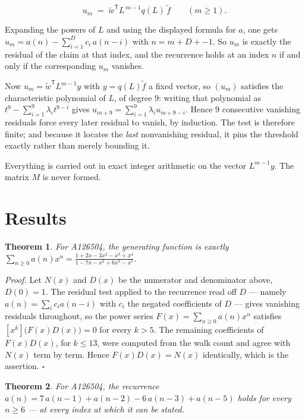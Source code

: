\documentclass[11pt]{article}
\newtheorem{theorem}{Theorem}
\theoremstyle{definition}
\begin{document}
\[u_m \;=\; \tilde w^{\mathsf T} L^{\,m-1} q(L)\,\tilde f \qquad (m \ge 1).\]

Expanding the powers of $L$ and using the displayed formula for $a$, one gets $u_m = a(n) - \sum_{i=1}^{D} c_i\,a(n-i)$ with $n = m + D + -1$. So $u_m$ is exactly the residual of the claim at that index, and the recurrence holds at an index $n$ if and only if the corresponding $u_m$ vanishes.

Now $u_m = \tilde w^{\mathsf T} L^{m-1} y$ with $y = q(L)\tilde f$ a fixed vector, so $(u_m)$ satisfies the characteristic polynomial of $L$, of degree $9$: writing that polynomial as $t^{9} - \sum_{i=1}^{9} \lambda_i t^{9-i}$ gives $u_{m+9} = \sum_{i=1}^{9} \lambda_i u_{m+9-i}$. Hence $9$ consecutive vanishing residuals force every later residual to vanish, by induction. The test is therefore finite; and because it locates the {\itshape last} nonvanishing residual, it pins the threshold exactly rather than merely bounding it.

Everything is carried out in exact integer arithmetic on the vector $L^{m-1}y$. The matrix $M$ is never formed.

\section{Results}

\begin{theorem} For A126504, the generating function is exactly $\sum_{n\ge 0} a(n)x^n = \frac{1 + 2x - 3x^{2} - x^{3} + x^{4}}{1 - 7x - x^{2} + 6x^{3} - x^{5}}$.\end{theorem}

{\itshape Proof.} Let $N(x)$ and $D(x)$ be the numerator and denominator above, $D(0)=1$. The residual test applied to the recurrence read off $D$ --- namely $a(n) = \sum_i c_i a(n-i)$ with $c_i$ the negated coefficients of $D$ --- gives vanishing residuals throughout, so the power series $F(x)=\sum_{n\ge 0}a(n)x^n$ satisfies $[x^k]\bigl(F(x)D(x)\bigr) = 0$ for every $k > 5$. The remaining coefficients of $F(x)D(x)$, for $k \le 13$, were computed from the walk count and agree with $N(x)$ term by term. Hence $F(x)D(x) = N(x)$ identically, which is the assertion. $\square$

\begin{theorem} For A126504, the recurrence $a(n) = 7\,a(n-1) + a(n-2) - 6\,a(n-3) + a(n-5)$ holds for every $n \ge 6$ --- at every index at which it can be stated.\end{theorem}
\end{document}
